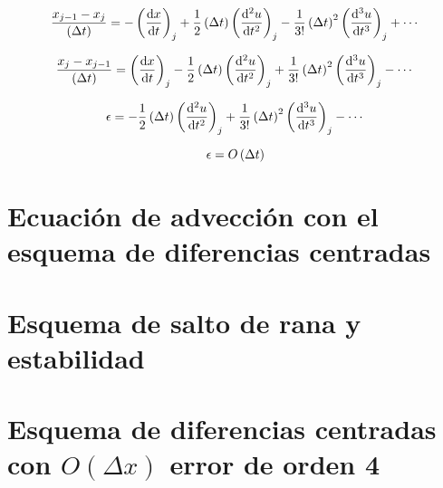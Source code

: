\documentclass{article}
\begin{document}
\begin{equation}
\frac{x_{j-1} - x_j}{\Dt} = - \derord{x}{t} + \frac12\Dt\derord[2]{u}{t} - 
	\frac1{3!}\dxdero{u}{t}{3} + \cdots
\end{equation}

\begin{equation}
\frac{x_{j} - x_{j-1}}{\Dt} = \derord{x}{t} - \frac12\Dt\derord[2]{u}{t} + \frac1{3!}\dxdero{u}{t}{3} - \cdots
\end{equation}

\begin{equation}
\epsilon = - \frac12\Dt\derord[2]{u}{t} + \frac1{3!}\dxdero{u}{t}{3} - \cdots
\end{equation}

\begin{equation}
\epsilon = O\left( \Delta t \right)
\end{equation}

\section{Ecuación de advección con el esquema de diferencias centradas}
%
%

\section{Esquema de salto de rana y estabilidad}

\section{Esquema de diferencias centradas con \texorpdfstring{$O(\Delta x)$}{} error de orden 4}
\end{document}
